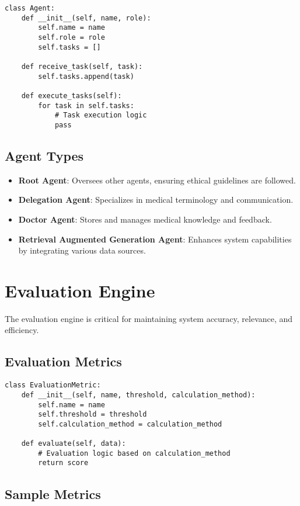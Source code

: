 \documentclass{article}
\begin{document}
\begin{verbatim}
class Agent:
    def __init__(self, name, role):
        self.name = name
        self.role = role
        self.tasks = []

    def receive_task(self, task):
        self.tasks.append(task)

    def execute_tasks(self):
        for task in self.tasks:
            # Task execution logic
            pass
\end{verbatim}

\subsection{Agent Types}

\begin{itemize}
    \item \textbf{Root Agent}: Oversees other agents, ensuring ethical guidelines are followed.
    \item \textbf{Delegation Agent}: Specializes in medical terminology and communication.
    \item \textbf{Doctor Agent}: Stores and manages medical knowledge and feedback.
    \item \textbf{Retrieval Augmented Generation Agent}: Enhances system capabilities by integrating various data sources.
\end{itemize}

\section{Evaluation Engine}

The evaluation engine is critical for maintaining system accuracy, relevance, and efficiency.

\subsection{Evaluation Metrics}

\begin{verbatim}
class EvaluationMetric:
    def __init__(self, name, threshold, calculation_method):
        self.name = name
        self.threshold = threshold
        self.calculation_method = calculation_method

    def evaluate(self, data):
        # Evaluation logic based on calculation_method
        return score
\end{verbatim}

\subsection{Sample Metrics}
\end{document}
